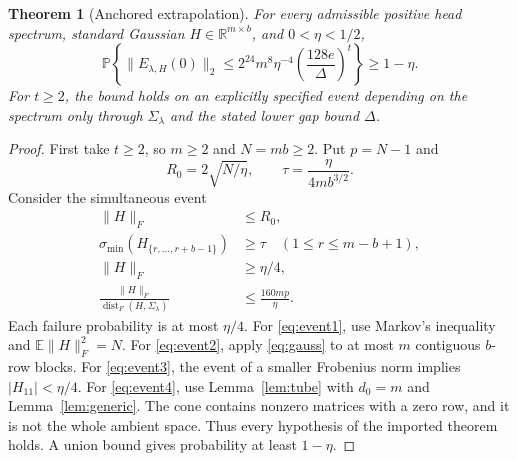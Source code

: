 \documentclass[11pt]{article}
\numberwithin{equation}{section}
\newtheorem{theorem}{Theorem}[section]
\theoremstyle{definition}
\newcommand{\R}{\mathbb R}
\newcommand{\E}{\mathbb E}
\newcommand{\Prob}{\mathbb P}
\newcommand{\dist}{\operatorname{dist}}
\newcommand{\sm}{\sigma_{\min}}
\newcommand{\nn}[1]{\lVert #1\rVert}
\begin{document}
\begin{theorem}[Anchored extrapolation]\label{thm:zero}
For every admissible positive head spectrum, standard Gaussian $H\in\R^{m\times b}$, and $0<\eta<1/2$,
\begin{equation}\label{eq:zero}
\Prob\left\{\nn{E_{\lambda,H}(0)}_2
\le 2^{24}m^8\eta^{-4}\left(\frac{128e}{\Delta}\right)^t\right\}\ge1-\eta.
\end{equation}
For $t\ge2$, the bound holds on an explicitly specified event depending on the spectrum only through $\Sigma_\lambda$ and the stated lower gap bound $\Delta$.
\end{theorem}
\begin{proof}
First take $t\ge2$, so $m\ge2$ and $N=mb\ge2$. Put $p=N-1$ and
\[
R_0=2\sqrt{N/\eta},\qquad
\tau=\frac{\eta}{4mb^{3/2}}.
\]
Consider the simultaneous event
\begin{align}
\nn H_F&\le R_0,\label{eq:event1}\\
\sm(H_{\{r,\ldots,r+b-1\}})&\ge\tau\quad(1\le r\le m-b+1),\label{eq:event2}\\
\nn H_F&\ge\eta/4,\label{eq:event3}\\
\frac{\nn H_F}{\dist_F(H,\Sigma_\lambda)}&\le\frac{160mp}{\eta}.\label{eq:event4}
\end{align}
Each failure probability is at most $\eta/4$. For \eqref{eq:event1}, use Markov's inequality and $\E\nn H_F^2=N$. For \eqref{eq:event2}, apply \eqref{eq:gauss} to at most $m$ contiguous $b$-row blocks. For \eqref{eq:event3}, the event of a smaller Frobenius norm implies $|H_{11}|<\eta/4$. For \eqref{eq:event4}, use Lemma~\ref{lem:tube} with $d_0=m$ and Lemma~\ref{lem:generic}. The cone contains nonzero matrices with a zero row, and it is not the whole ambient space. Thus every hypothesis of the imported theorem holds. A union bound gives probability at least $1-\eta$.


\end{proof}
\end{document}
